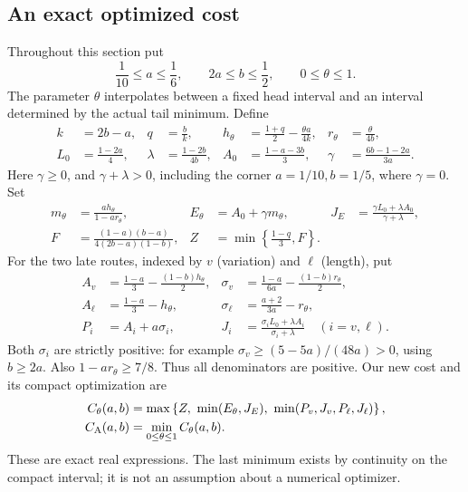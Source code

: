 \subsection{An exact optimized cost}
Throughout this section put
\begin{equation}\label{adaptive:range}
 \frac1{10}\le a\le\frac16,\qquad 2a\le b\le\frac12,
 \qquad 0\le\theta\le1.
\end{equation}
The parameter \(\theta\) interpolates between a fixed head interval and an
interval determined by the actual tail minimum. Define
\begin{align*}
 k&=2b-a,&q&=\frac b{k},&
 h_\theta&=\frac{1+q}{2}-\frac{\theta a}{4k},&
 r_\theta&=\frac\theta{4b},\\
 L_0&=\frac{1-2a}{4},&\lambda&=\frac{1-2b}{4b},&
 A_0&=\frac{1-a-3b}{3},&\gamma&=\frac{6b-1-2a}{3a}.
\end{align*}
Here \(\gamma\ge0\), and \(\gamma+\lambda>0\), including the corner
\(a=1/10,b=1/5\), where \(\gamma=0\). Set
\begin{align}
 m_\theta&=\frac{a h_\theta}{1-a r_\theta},&
 E_\theta&=A_0+\gamma m_\theta,&
 J_E&=\frac{\gamma L_0+\lambda A_0}{\gamma+\lambda},
 \label{adaptive:early}\\
 F&=\frac{(1-a)(b-a)}{4(2b-a)(1-b)},&
 Z&=\min\left\{\frac{1-q}{3},F\right\}.
 \label{adaptive:zero}
\end{align}
For the two late routes, indexed by \(v\) (variation) and \(\ell\) (length), put
\begin{align*}
 A_v&=\frac{1-a}{3}-\frac{(1-b)h_\theta}{2},&
 \sigma_v&=\frac{1-a}{6a}-\frac{(1-b)r_\theta}{2},\\
 A_\ell&=\frac{1-a}{3}-h_\theta,&
 \sigma_\ell&=\frac{a+2}{3a}-r_\theta,\\
 P_i&=A_i+a\sigma_i,&
 J_i&=\frac{\sigma_iL_0+\lambda A_i}{\sigma_i+\lambda}
 \quad(i=v,\ell).
\end{align*}
Both \(\sigma_i\) are strictly positive: for example
\(\sigma_v\ge(5-5a)/(48a)>0\), using \(b\ge2a\).
Also \(1-a r_\theta\ge7/8\). Thus all denominators are positive.
Our new cost and its compact optimization are
\begin{align}
 C_\theta(a,b)&=\max\left\{Z,\ \min(E_\theta,J_E),\
                  \min(P_v,J_v,P_\ell,J_\ell)\right\},
                   \label{adaptive:cost}\\
 C_{\rm A}(a,b)&=\min_{0\le\theta\le1}C_\theta(a,b).
                   \label{adaptive:optimized}
\end{align}
These are exact real expressions. The last minimum exists by continuity on
the compact interval; it is not an assumption about a numerical optimizer.

